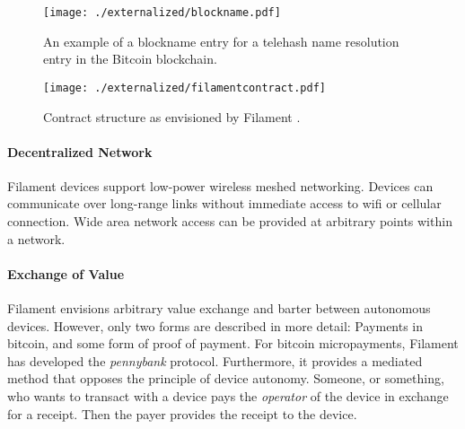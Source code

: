 \begin{figure}
\centering
\texttt{[image: ./externalized/blockname.pdf]}
\caption{An example of a blockname entry for a telehash name resolution entry in the Bitcoin blockchain.}
\label{fig:blockname}
\end{figure}


\begin{figure}
\centering
\texttt{[image: ./externalized/filamentcontract.pdf]}
\caption{Contract structure as envisioned by Filament \cite{filament}.}
\label{fig:filament}
\end{figure}

\paragraph{Decentralized Network}
Filament devices support low-power wireless meshed networking. Devices can communicate over long-range links without immediate access to wifi or cellular connection. Wide area network access can be provided at arbitrary points within a network.


\paragraph{Exchange of Value}

Filament envisions arbitrary value exchange and barter between autonomous devices. However, only two forms are described in more detail: Payments in bitcoin, and some form of proof of payment. For bitcoin micropayments, Filament has developed the \emph{pennybank} protocol. Furthermore, it provides a mediated method that opposes the principle of device autonomy. Someone, or something, who wants to transact with a device pays the \emph{operator} of the device in exchange for a receipt. Then the payer provides the receipt to the device. 






